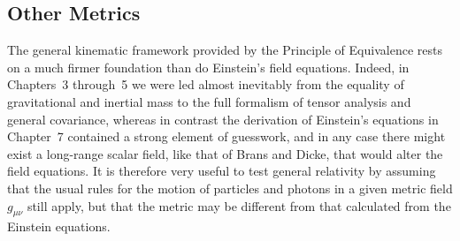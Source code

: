 
\subsection{Other Metrics}\label{sec:8.3}

The general kinematic framework provided by the Principle of Equivalence
rests on a much firmer foundation than do Einstein's field equations.
Indeed, in Chapters~3 through~5 we were led almost inevitably from the
equality of gravitational and inertial mass to the full formalism of tensor
analysis and general covariance, whereas in contrast the derivation of
Einstein's equations in Chapter~7 contained a strong element of guesswork,
and in any case there might exist a long-range scalar field, like that of
Brans and Dicke, that would alter the field equations. It is therefore very
useful to test general relativity by assuming that the usual rules for the
motion of particles and photons in a given metric field \(g_{\mu\nu}\) still
apply, but that the metric may be different from that calculated from the
Einstein equations.

